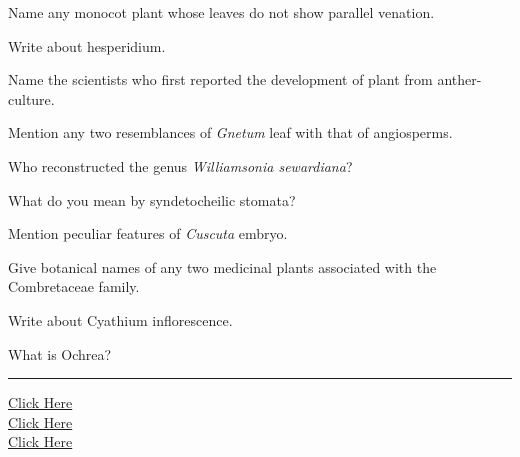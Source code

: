 \documentclass[11pt,a4paper]{article}
\begin{document}
\begin{parts}
  \item Name any monocot plant whose leaves do not show parallel venation.
  \item Write about hesperidium.
  \item Name the scientists who first reported the development of plant from anther-culture.
  \item Mention any two resemblances of   \textit{Gnetum} leaf with that of angiosperms.
  \item Who reconstructed the genus   \textit{Williamsonia sewardiana}?
  \item What do you mean by syndetocheilic stomata?
  \item Mention peculiar features of   \textit{Cuscuta} embryo.
  \item Give botanical names of any two medicinal plants associated with the Combretaceae family.
  \item Write about Cyathium inflorescence.
  \item What is Ochrea?
\end{parts}

\vfill
\rule{\linewidth}{0.4pt}

\begin{center}\small
\href{https://bhu-exam.vercel.app/}{Click Here}\\[4pt]\href{https://me-aryan.vercel.app/}{Click Here}\\[4pt]\href{https://quashan-me.vercel.app/}{Click Here}
\end{center}
\end{document}
